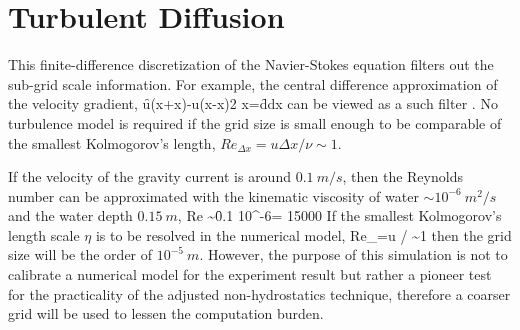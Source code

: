 \normalsize
\section{Turbulent Diffusion}

This finite-difference discretization of the Navier-Stokes equation filters out the sub-grid scale information.
For example, the central difference approximation of the velocity gradient,
\be
\f{u(x+\Delta x)-u(x-\Delta x)}{2 \Delta x}=\f{d}{dx}
\ee
can be viewed as a such filter \cite{Wilcox1994}.
No turbulence model is required if the grid size is small enough to be comparable of the smallest Kolmogorov's length, $Re_{\Delta x} = u \Delta x / \nu \sim 1$.

If the velocity of the gravity current is around $0.1 \ m/s$, then the Reynolds number can be approximated with the kinematic viscosity of water $\sim 10^{-6} \ m^2/s$ and the water depth $0.15 \ m$,
\be
Re \sim \f{0.1 }{10^{-6}}= 15000
\ee
If the smallest Kolmogorov's length scale $\eta$ is to be resolved in the numerical model,
\be
Re_{\eta}=u \eta/ \nu \sim 1
\ee
then the grid size will be the order of $10^{-5} \ m$. However, the purpose of this simulation is not to calibrate a numerical model for the experiment result but rather a pioneer test for the practicality of the adjusted non-hydrostatics technique, therefore a coarser grid will be used to lessen the computation burden. 